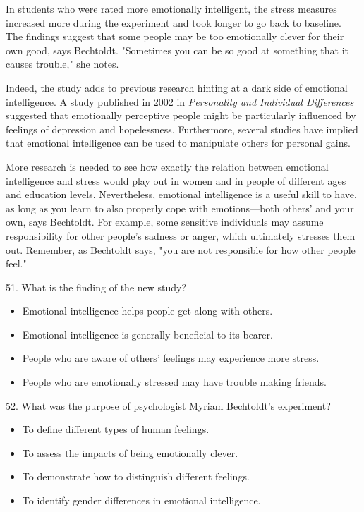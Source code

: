 \documentclass[UTF8,11pt]{ctexart}
\begin{document}
In students who were rated more emotionally intelligent, the stress measures increased more during the experiment and took longer to go back to baseline. The findings suggest that some people may be too emotionally clever for their own good, says Bechtoldt. "Sometimes you can be so good at something that it causes trouble," she notes.


Indeed, the study adds to previous research hinting at a dark side of emotional intelligence. A study published in 2002 in \textit{Personality and Individual Differences} suggested that emotionally perceptive people might be particularly influenced by feelings of depression and hopelessness. Furthermore, several studies have implied that emotional intelligence can be used to manipulate others for personal gains.


More research is needed to see how exactly the relation between emotional intelligence and stress would play out in women and in people of different ages and education levels. Nevertheless, emotional intelligence is a useful skill to have, as long as you learn to also properly cope with emotions—both others' and your own, says Bechtoldt. For example, some sensitive individuals may assume responsibility for other people's sadness or anger, which ultimately stresses them out. Remember, as Bechtoldt says, "you are not responsible for how other people feel."


51. What is the finding of the new study?


\begin{itemize}[leftmargin=2em,itemsep=.2em,topsep=.4em]\item[A.] Emotional intelligence helps people get along with others.
\item[B.] Emotional intelligence is generally beneficial to its bearer.
\item[C.] People who are aware of others' feelings may experience more stress.
\item[D.] People who are emotionally stressed may have trouble making friends.
\end{itemize}

52. What was the purpose of psychologist Myriam Bechtoldt's experiment?


\begin{itemize}[leftmargin=2em,itemsep=.2em,topsep=.4em]\item[A.] To define different types of human feelings.
\item[B.] To assess the impacts of being emotionally clever.
\item[C.] To demonstrate how to distinguish different feelings.
\item[D.] To identify gender differences in emotional intelligence.
\end{itemize}
\end{document}
